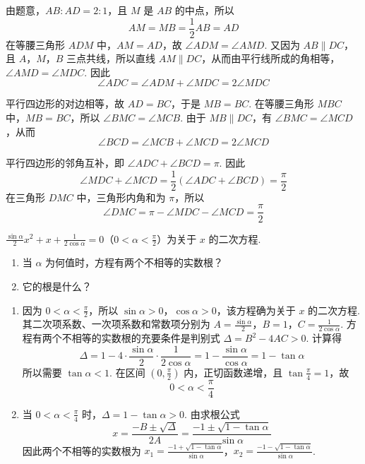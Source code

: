 \begin{solution}
由题意，\(AB:AD=2:1\)，且 \(M\) 是 \(AB\) 的中点，所以
\[
AM=MB=\frac{1}{2}AB=AD
\]
在等腰三角形 \(ADM\) 中，\(AM=AD\)，故
\(\angle ADM=\angle AMD\). 又因为 \(AB\parallel DC\)，且 \(A\)，\(M\)，\(B\) 三点共线，所以直线 \(AM\parallel DC\)，从而由平行线所成的角相等，\(\angle AMD=\angle MDC\). 因此
\[
\angle ADC=\angle ADM+\angle MDC=2\angle MDC
\]


平行四边形的对边相等，故 \(AD=BC\)，于是 \(MB=BC\). 在等腰三角形 \(MBC\) 中，\(MB=BC\)，所以 \(\angle BMC=\angle MCB\). 由于 \(MB\parallel DC\)，有 \(\angle BMC=\angle MCD\)，从而
\[
\angle BCD=\angle MCB+\angle MCD=2\angle MCD
\]

平行四边形的邻角互补，即 \(\angle ADC+\angle BCD=\pi\). 因此
\[
\angle MDC+\angle MCD
=\frac{1}{2}\left( \angle ADC+\angle BCD \right)
=\frac{\pi}{2}
\]
在三角形 \(DMC\) 中，三角形内角和为 \(\pi\)，所以
\[
\angle DMC=\pi-\angle MDC-\angle MCD=\frac{\pi}{2}
\]
\end{solution}

\begin{problem}
\(\frac{\sin\alpha}{2}x^2+x+\frac{1}{2\cos\alpha}=0\)（\(0<\alpha<\frac{\pi}{2}\)）为关于 \(x\) 的二次方程.

\begin{enumerate}
\item 当 \(\alpha\) 为何值时，方程有两个不相等的实数根？
\item 它的根是什么？
\end{enumerate}
\end{problem}

\begin{solution}
\begin{enumerate}
\item 因为 \(0<\alpha<\frac{\pi}{2}\)，所以 \(\sin\alpha>0\)，\(\cos\alpha>0\)，该方程确为关于 \(x\) 的二次方程. 其二次项系数、一次项系数和常数项分别为
\(A=\frac{\sin\alpha}{2}\)，\(B=1\)，\(C=\frac{1}{2\cos\alpha}\).
方程有两个不相等的实数根的充要条件是判别式 \(\Delta=B^2-4AC>0\). 计算得
\[
\Delta=1-4\cdot\frac{\sin\alpha}{2}\cdot\frac{1}{2\cos\alpha}
=1-\frac{\sin\alpha}{\cos\alpha}=1-\tan\alpha
\]
所以需要 \(\tan\alpha<1\). 在区间 \(\left(0,\frac{\pi}{2}\right)\) 内，正切函数递增，且 \(\tan\frac{\pi}{4}=1\)，故
\[
0<\alpha<\frac{\pi}{4}
\]

\item 当 \(0<\alpha<\frac{\pi}{4}\) 时，\(\Delta=1-\tan\alpha>0\). 由求根公式
\[
x=\frac{-B\pm\sqrt{\Delta}}{2A}
=\frac{-1\pm\sqrt{1-\tan\alpha}}{\sin\alpha}
\]
因此两个不相等的实数根为
\(x_1=\frac{-1+\sqrt{1-\tan\alpha}}{\sin\alpha}\)，\(x_2=\frac{-1-\sqrt{1-\tan\alpha}}{\sin\alpha}\).
\end{enumerate}
\end{solution}

